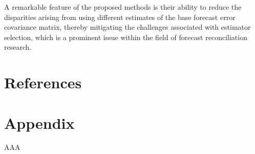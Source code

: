 \documentclass[11pt,a4paper,]{article}
\begin{document}
A remarkable feature of the proposed methods is their ability to reduce
the disparities arising from using different estimates of the base
forecast error covariance matrix, thereby mitigating the challenges
associated with estimator selection, which is a prominent issue within
the field of forecast reconciliation research.

\hypertarget{references}{%
\section*{References}\label{references}}

\printbibliography[heading=none]

\newpage
\appendix
\setcounter{section}{0}
\renewcommand{\thesection}{\Alph{section}}
\renewcommand{\thefigure}{A\arabic{figure}}
\renewcommand{\thetable}{A\arabic{table}}
\setcounter{figure}{0}
\setcounter{table}{0}

\hypertarget{appendix}{%
\section*{Appendix}\label{appendix}}

AAA
\end{document}
